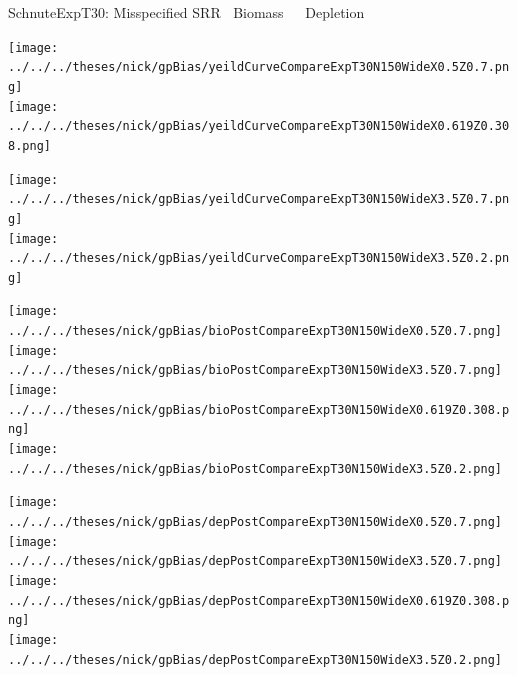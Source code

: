 \documentclass[ xcolor = pdftex, dvipsnames, table ]{beamer}
\begin{document}
%
\begin{frame}{SchnuteExpT30: Misspecified SRR $~$ Biomass $~~~~$ Depletion}
$~$
\hspace*{-1.25cm}
\begin{minipage}[h!]{0.25\textwidth}
\texttt{[image: ../../../theses/nick/gpBias/yeildCurveCompareExpT30N150WideX0.5Z0.7.png]}\\
\texttt{[image: ../../../theses/nick/gpBias/yeildCurveCompareExpT30N150WideX0.619Z0.308.png]}
\end{minipage}
\begin{minipage}[h!]{0.25\textwidth}
\hspace*{0.45cm}
\texttt{[image: ../../../theses/nick/gpBias/yeildCurveCompareExpT30N150WideX3.5Z0.7.png]}\\
\hspace*{0.45cm}
\texttt{[image: ../../../theses/nick/gpBias/yeildCurveCompareExpT30N150WideX3.5Z0.2.png]}
\end{minipage}
\begin{minipage}[h!]{0.25\textwidth}
\vspace{-0.1cm}
\hspace*{1.5cm}
\texttt{[image: ../../../theses/nick/gpBias/bioPostCompareExpT30N150WideX0.5Z0.7.png]}\\
\hspace*{1.5cm}
\texttt{[image: ../../../theses/nick/gpBias/bioPostCompareExpT30N150WideX3.5Z0.7.png]}\\
\hspace*{1.5cm}
\texttt{[image: ../../../theses/nick/gpBias/bioPostCompareExpT30N150WideX0.619Z0.308.png]}\\
\hspace*{1.5cm}
\texttt{[image: ../../../theses/nick/gpBias/bioPostCompareExpT30N150WideX3.5Z0.2.png]}
\end{minipage}
\begin{minipage}[h!]{0.25\textwidth}
\vspace{-0.1cm}
\hspace*{1.5cm}
\texttt{[image: ../../../theses/nick/gpBias/depPostCompareExpT30N150WideX0.5Z0.7.png]}\\
\hspace*{1.5cm}
\texttt{[image: ../../../theses/nick/gpBias/depPostCompareExpT30N150WideX3.5Z0.7.png]}\\
\hspace*{1.5cm}
\texttt{[image: ../../../theses/nick/gpBias/depPostCompareExpT30N150WideX0.619Z0.308.png]}\\
\hspace*{1.5cm}
\texttt{[image: ../../../theses/nick/gpBias/depPostCompareExpT30N150WideX3.5Z0.2.png]}
\end{minipage}
\end{frame}
\end{document}
